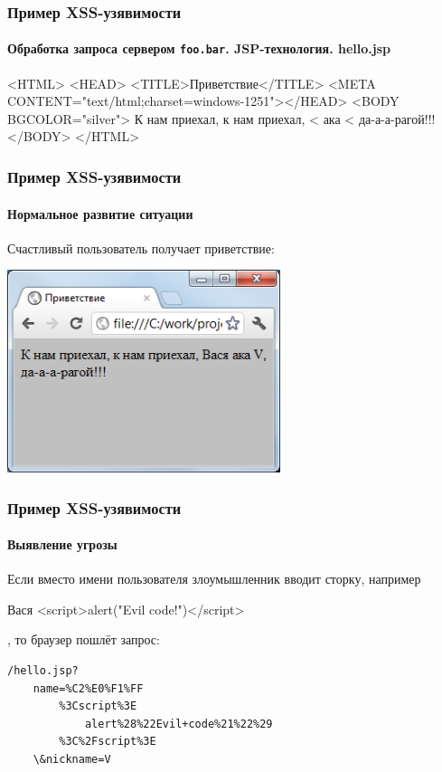 \begin{frame}[fragile]
    \frametitle{Пример XSS-узявимости}
    \framesubtitle{Обработка запроса сервером \verb"foo.bar". JSP-технология. hello.jsp}
        
    \begin{semiverbatim}
<HTML> 
  <HEAD> <TITLE>Приветствие</TITLE>
    <META CONTENT="text/html;charset=windows-1251"></HEAD>
  <BODY BGCOLOR="silver">
    К нам приехал, к нам приехал, 
    <%
    ака <%
    да-а-а-рагой!!!
  </BODY>
</HTML>
    \end{semiverbatim}
\end{frame}

\begin{frame}[fragile]
    \frametitle{Пример XSS-узявимости}
    \framesubtitle{Нормальное развитие ситуации}
    
    Счастливый пользователь получает приветствие:
    
    \includegraphics[width=0.6\textwidth]{fig/htmlxssok.png}
\end{frame}

\begin{frame}[fragile]
    \frametitle{Пример XSS-узявимости}
    \framesubtitle{Выявление угрозы}
    
    Если вместо имени пользователя злоумышленник вводит сторку, например
\begin{semiverbatim}
Вася\alert{ <script>alert("Evil code!")</script>}
\end{semiverbatim}
    , то браузер пошлёт запрос:
\begin{verbatim}
/hello.jsp?
    name=%C2%E0%F1%FF
        %3Cscript%3E
            alert%28%22Evil+code%21%22%29
        %3C%2Fscript%3E
    \&nickname=V
\end{verbatim}
\end{frame}

